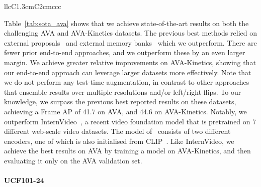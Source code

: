 \documentclass[10pt,twocolumn,letterpaper]{article}
\def \paravspace {-0.7\baselineskip}
\begin{document}
\begin{table*}[t]
{\begin{tabular}{llcC{1.3cm}C{2cm}ccc}
		\bottomrule
	\end{tabular}
	} \vspace{-0.5\baselineskip}
	\label{tab:sota_ava}
\end{table*} 
Table~\ref{tab:sota_ava} shows that we achieve state-of-the-art results on both the challenging AVA and AVA-Kinetics datasets.
The previous best methods relied on external proposals~\cite{wang2022internvideo, wu2022memvit, arnab2022beyond} and external memory banks~\cite{pan2021actor, wu2022memvit} which we outperform.
There are fewer prior end-to-end approaches, and we outperform these by an even larger margin.
We achieve greater relative improvements on AVA-Kinetics, showing that our end-to-end approach can leverage larger datasets more effectively.
Note that we do not perform any test-time augmentation, in contrast to other approaches that ensemble results over multiple resolutions and/or left/right flips.
To our knowledge, we surpass the previous best reported results on these datasets, achieving a Frame AP of 41.7 on AVA, and 44.6 on AVA-Kinetics.
Notably, we outperform InternVideo~\cite{wang2022internvideo}, a recent video foundation model that is pretrained on 7 different web-scale video datasets.
The model of~\cite{wang2022internvideo} consists of two different encoders, one of which is also initialised from CLIP~\cite{radford2021learning}.
Like InternVideo, we achieve the best results on AVA by training a model on AVA-Kinetics, and then evaluating it only on the AVA validation set.

\vspace{\paravspace}
\paragraph{UCF101-24}
\end{document}
